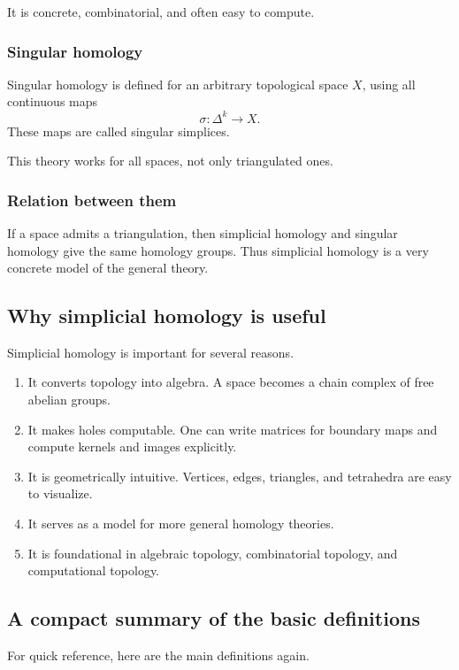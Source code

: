 \documentclass[12pt,a4paper]{article}
\theoremstyle{notespace}
\begin{document}
It is concrete, combinatorial, and often easy to compute.

\subsubsection{Singular homology}

Singular homology is defined for an arbitrary topological space \(X\), using all continuous maps
\[
\sigma:\Delta^k\to X.
\]
These maps are called singular simplices.

This theory works for all spaces, not only triangulated ones.

\subsubsection{Relation between them}

If a space admits a triangulation, then simplicial homology and singular homology give the same homology groups. Thus simplicial homology is a very concrete model of the general theory.

\subsection{Why simplicial homology is useful}

Simplicial homology is important for several reasons.

\begin{enumerate}
	\item It converts topology into algebra. A space becomes a chain complex of free abelian groups.
	\item It makes holes computable. One can write matrices for boundary maps and compute kernels and images explicitly.
	\item It is geometrically intuitive. Vertices, edges, triangles, and tetrahedra are easy to visualize.
	\item It serves as a model for more general homology theories.
	\item It is foundational in algebraic topology, combinatorial topology, and computational topology.
\end{enumerate}

\subsection{A compact summary of the basic definitions}

For quick reference, here are the main definitions again.
\end{document}
